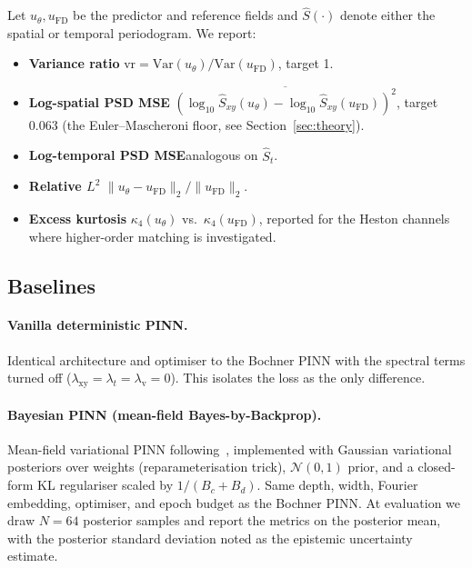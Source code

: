 \documentclass[review,12pt]{elsarticle}
\begin{document}
Let \(u_\theta, u_{\mathrm{FD}}\) be the predictor and reference
fields and \(\widehat S(\cdot)\) denote either the spatial or
temporal periodogram. We report:
\begin{itemize}
\item \textbf{Variance ratio}\quad
\(\mathrm{vr} = \mathrm{Var}(u_\theta)/\mathrm{Var}(u_{\mathrm{FD}})\),
target 1.
\item \textbf{Log-spatial PSD MSE}\quad
\(\overline{(\log_{10}\widehat S_{xy}(u_\theta) -
\log_{10}\widehat S_{xy}(u_{\mathrm{FD}}))^2}\), target 0.063
(the Euler--Mascheroni floor, see Section~\ref{sec:theory}).
\item \textbf{Log-temporal PSD MSE}\quad analogous on
\(\widehat S_t\).
\item \textbf{Relative \(L^2\)}\quad
\(\|u_\theta - u_{\mathrm{FD}}\|_2 / \|u_{\mathrm{FD}}\|_2\).
\item \textbf{Excess kurtosis}\quad
\(\kappa_4(u_\theta)\) vs.\ \(\kappa_4(u_{\mathrm{FD}})\), reported
for the Heston channels where higher-order matching is investigated.
\end{itemize}

\subsection{Baselines}

\paragraph{Vanilla deterministic PINN.} Identical architecture and
optimiser to the Bochner PINN with the spectral terms turned off
(\(\lambda_{\mathrm{xy}} = \lambda_t = \lambda_{\mathrm v} = 0\)).
This isolates the loss as the only difference.

\paragraph{Bayesian PINN (mean-field Bayes-by-Backprop).}
Mean-field variational PINN following~\cite{YangMengKarniadakis2021},
implemented with Gaussian variational posteriors over weights
(reparameterisation trick), \(\mathcal N(0, 1)\) prior, and a
closed-form KL regulariser scaled by \(1/(B_c + B_d)\). Same
depth, width, Fourier embedding, optimiser, and epoch budget as
the Bochner PINN. At evaluation we draw \(N = 64\) posterior
samples and report the metrics on the posterior mean, with the
posterior standard deviation noted as the epistemic uncertainty
estimate.
\end{document}
